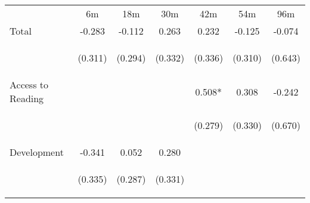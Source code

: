 \begin{tabular}{lcccccc}
\hline \noalign{\smallskip} & 6m & 18m & 30m & 42m & 54m & 96m\\
\noalign{\smallskip}\hline \noalign{\smallskip}Total & -0.283 & -0.112 & 0.263 & 0.232 & -0.125 & -0.074\\
 & \begin{footnotesize}(0.311)\end{footnotesize} & \begin{footnotesize}(0.294)\end{footnotesize} & \begin{footnotesize}(0.332)\end{footnotesize} & \begin{footnotesize}(0.336)\end{footnotesize} & \begin{footnotesize}(0.310)\end{footnotesize} & \begin{footnotesize}(0.643)\end{footnotesize}\\
\noalign{\smallskip}Access to Reading &  &  &  & 0.508* & 0.308 & -0.242\\
 & \begin{footnotesize}\end{footnotesize} & \begin{footnotesize}\end{footnotesize} & \begin{footnotesize}\end{footnotesize} & \begin{footnotesize}(0.279)\end{footnotesize} & \begin{footnotesize}(0.330)\end{footnotesize} & \begin{footnotesize}(0.670)\end{footnotesize}\\
\noalign{\smallskip}Development & -0.341 & 0.052 & 0.280 &  &  & \\
 & \begin{footnotesize}(0.335)\end{footnotesize} & \begin{footnotesize}(0.287)\end{footnotesize} & \begin{footnotesize}(0.331)\end{footnotesize} & \begin{footnotesize}\end{footnotesize} & \begin{footnotesize}\end{footnotesize} & \begin{footnotesize}\end{footnotesize}\\

\end{tabular}
